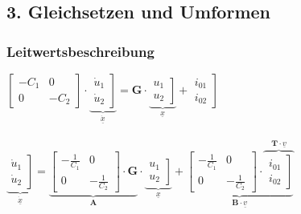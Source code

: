 \documentclass[a4paper,twocolumn,10pt]{article}
\begin{document}
\subsection*{3. Gleichsetzen und Umformen}
\subsubsection*{Leitwertsbeschreibung}
$\begin{bmatrix}-C_1 & 0 \\ 0 & -C_2\end{bmatrix}\cdot \underbrace{\left.\begin{matrix}\dot u_1 \\ \dot u_2\end{matrix}\right]}_{\underline{\dot x}}=\textbf{G}\cdot \underbrace{\left.\begin{matrix}u_1 \\ u_2\end{matrix}\right]}_{\underline{x}}+\left.\begin{matrix}i_{01} \\ i_{02}\end{matrix}\right]$\\\\
$\underbrace{\left.\begin{matrix}\dot u_1 \\ \dot u_2\end{matrix}\right]}_{\underline{\dot x}}=\underbrace{\begin{bmatrix}-\frac{1}{C_1} & 0 \\ 0 & -\frac{1}{C_2}\end{bmatrix}\cdot\textbf{G}}_{\textbf{A}}\cdot \underbrace{\left.\begin{matrix}u_1 \\ u_2\end{matrix}\right]}_{\underline{x}}+\underbrace{\begin{bmatrix}-\frac{1}{C_1} & 0 \\ 0 & -\frac{1}{C_2}\end{bmatrix}\cdot\overbrace{\left.\begin{matrix}i_{01} \\ i_{02}\end{matrix}\right]}^{\textbf{T}\cdot \underline{v}}}_{\textbf{B}\cdot \underline{v}}$
\end{document}
